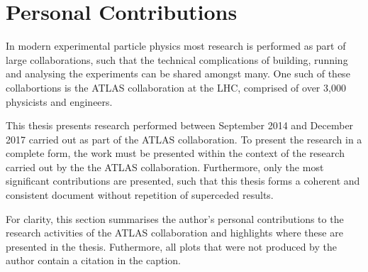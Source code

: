 \section{Personal Contributions}

In modern experimental particle physics most research is performed as part of large collaborations,
such that the technical complications of building, running and analysing the experiments can be shared amongst many.
One such of these collabortions is the ATLAS collaboration at the LHC, comprised of over 3,000 physicists and engineers.

This thesis presents research performed between September 2014 and December 2017 carried out as part of the ATLAS collaboration.
To present the research in a complete form, the work must be presented within the context of the research carried out by the the ATLAS collaboration.
Furthermore, only the most significant contributions are presented,
such that this thesis forms a coherent and consistent document without repetition of superceded results.

For clarity, this section summarises the author's personal contributions to the research activities of the ATLAS collaboration
and highlights where these are presented in the thesis.
Futhermore, all plots that were not produced by the author contain a citation in the caption.

